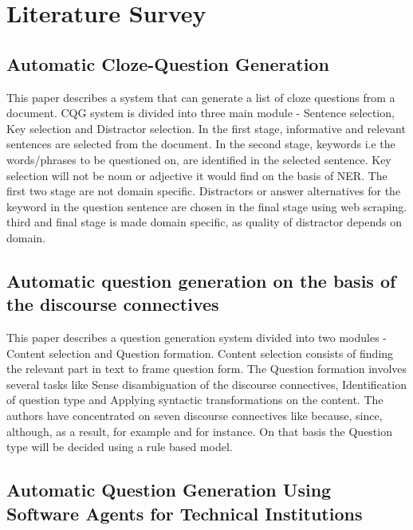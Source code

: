 %

\chapter{Literature Survey}
\section{Automatic Cloze-Question Generation}
This paper describes a system that can generate a list of cloze questions from a
document. CQG system is divided into three main module - Sentence selection, Key
selection and Distractor selection. In the first stage, informative and relevant
sentences are selected from the document. In the second stage, keywords i.e the
words/phrases to be questioned on, are identified in the selected sentence. Key
selection will not be noun or adjective it would find on the basis of NER. The
first two stage are not domain specific. Distractors or answer alternatives for
the keyword in the question sentence are chosen in the final stage using web
scraping. third and final stage is made domain specific, as quality of
distractor depends on domain. 

\section{Automatic question generation on the basis of the discourse
connectives}

This paper describes a question generation system divided into two modules -
Content selection and Question formation. Content selection consists of finding
the relevant part in text to frame question form. The Question formation
involves several tasks like Sense disambiguation of the discourse connectives,
Identification of question type and Applying syntactic transformations on the
content. The authors have concentrated on seven discourse connectives like
because, since, although, as a result, for example and for instance. On that
basis the Question type will be decided using a rule based model. 

\section{Automatic Question Generation Using Software Agents for Technical
Institutions}

